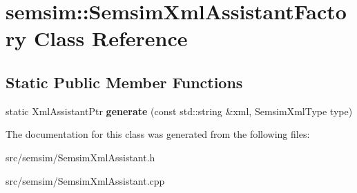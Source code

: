 \hypertarget{classsemsim_1_1SemsimXmlAssistantFactory}{}\section{semsim\+:\+:Semsim\+Xml\+Assistant\+Factory Class Reference}
\label{classsemsim_1_1SemsimXmlAssistantFactory}
\subsection*{Static Public Member Functions}
\begin{DoxyCompactItemize}
\item 
\mbox{\label{classsemsim_1_1SemsimXmlAssistantFactory_af24bed5c527a0a05d0fe579f1faa6dfd}} 
static Xml\+Assistant\+Ptr {\bfseries generate} (const std\+::string \&xml, Semsim\+Xml\+Type type)
\end{DoxyCompactItemize}


The documentation for this class was generated from the following files\+:\begin{DoxyCompactItemize}
\item 
src/semsim/Semsim\+Xml\+Assistant.\+h\item 
src/semsim/Semsim\+Xml\+Assistant.\+cpp\end{DoxyCompactItemize}
